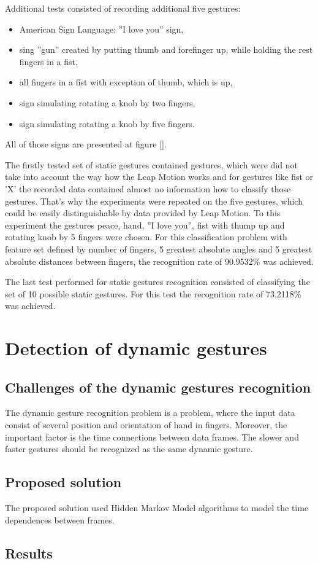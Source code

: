 Additional tests consisted of recording additional five gestures:
\begin{itemize}
\item American Sign Language: ''I love you'' sign,
\item sing ''gun'' created by putting thumb and forefinger up, while holding the rest fingers in a fist,
\item all fingers in a fist with exception of thumb, which is up,
\item sign simulating rotating a knob by two fingers,
\item sign simulating rotating a knob by five fingers.
\end{itemize}
All of those signs are presented at figure [].

The firstly tested set of static gestures contained gestures, which were did not take into account the way how the Leap Motion works and for gestures like fist or 'X' the recorded data contained almost no information how to classify those gestures.
That's why the experiments were repeated on the five gestures, which could be easily distinguishable by data provided by Leap Motion. To this experiment the gestures peace, hand, ''I love you'', fist with thump up and rotating knob by 5 fingers were chosen.
For this classification problem with feature set defined by number of fingers, 5 greatest absolute angles and 5 greatest absolute distances between fingers, the recognition rate of 90.9532\% was achieved. 

The last test performed for static gestures recognition consisted of classifying the set of 10 possible static gestures. For this test the recognition rate of 73.2118\% was achieved.

\section{Detection of dynamic gestures}

\subsection{Challenges of the dynamic gestures recognition}

The dynamic gesture recognition problem is a problem, where the input data consist of several position and orientation of hand in fingers. 
Moreover, the important factor is the time connections between data frames. The slower and faster gestures should be recognized as the same dynamic gesture.

\subsection{Proposed solution}

The proposed solution used Hidden Markov Model algorithms to model the time dependences between frames.



\subsection{Results}
